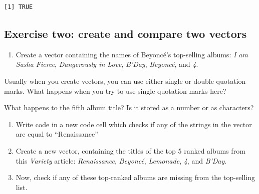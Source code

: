 \documentclass[
  letterpaper,
  DIV=11,
  numbers=noendperiod]{scrreprt}
\providecommand{\tightlist}{%
  \setlength{\itemsep}{0pt}\setlength{\parskip}{0pt}}
\begin{document}
\begin{verbatim}
[1] TRUE
\end{verbatim}

\subsection{Exercise two: create and compare two
vectors}\label{exercise-two-create-and-compare-two-vectors}

\begin{enumerate}
\def\labelenumi{\arabic{enumi}.}
\tightlist
\item
  Create a vector containing the names of Beyoncé's top-selling albums:
  \emph{I am Sasha Fierce}, \emph{Dangerously in Love}, \emph{B'Day},
  \emph{Beyoncé}, and \emph{4}.
\end{enumerate}

\begin{tcolorbox}[enhanced jigsaw, coltitle=black, bottomrule=.15mm, title=\textcolor{quarto-callout-tip-color}{\faLightbulb}\hspace{0.5em}{Tip}, leftrule=.75mm, colframe=quarto-callout-tip-color-frame, breakable, toprule=.15mm, opacityback=0, bottomtitle=1mm, toptitle=1mm, colback=white, rightrule=.15mm, titlerule=0mm, left=2mm, arc=.35mm, opacitybacktitle=0.6, colbacktitle=quarto-callout-tip-color!10!white]

Usually when you create vectors, you can use either single or double
quotation marks. What happens when you try to use single quotation marks
here?

What happens to the fifth album title? Is it stored as a number or as
characters?

\end{tcolorbox}

\begin{enumerate}
\def\labelenumi{\arabic{enumi}.}
\setcounter{enumi}{1}
\item
  Write code in a new code cell which checks if any of the strings in
  the vector are equal to ``Renaissance''
\item
  Create a new vector, containing the titles of the top 5 ranked albums
  from this \emph{Variety} article: \emph{Renaissance}, \emph{Beyoncé},
  \emph{Lemonade}, \emph{4}, and \emph{B'Day}.
\item
  Now, check if any of these top-ranked albums are missing from the
  top-selling list.
\end{enumerate}
\end{document}
